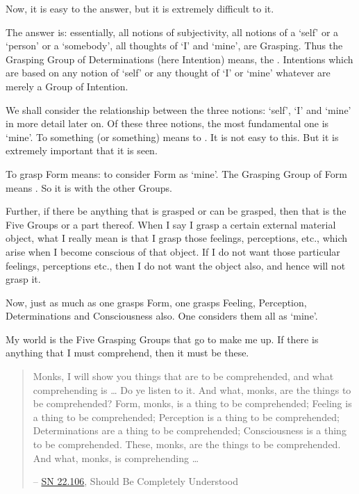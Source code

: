 Now, it is easy to  the answer, but it is extremely difficult to  it.

The answer is: essentially, all notions of subjectivity, all notions of a `self' or a `person' or a `somebody', all thoughts of `I' and `mine', are Grasping. Thus the Grasping Group of Determinations (here Intention) means, the . Intentions which are  based on any notion of `self' or any thought of `I' or `mine' whatever are merely a Group of Intention.

We shall consider the relationship between the three notions: `self', `I' and `mine' in more detail later on. Of these three notions, the most fundamental one is `mine'. To  something (or  something) means to . It is not easy to  this. But it is extremely important that it is seen.

To grasp Form means: to consider Form as `mine'. The Grasping Group of Form means . So it is with the other Groups.

Further, if there be anything that is grasped or can be grasped, then that is the Five Groups or a part thereof. When I say I grasp a certain external material object, what I really mean is that I grasp those feelings, perceptions, etc., which arise when I become conscious of that object. If I do not want those particular feelings, perceptions etc., then I do not want the object also, and hence will not grasp it.

Now, just as much as one grasps Form, one grasps Feeling, Perception, Determinations and Consciousness also. One considers them all as `mine'.

My world is the Five Grasping Groups that go to make me up. If there is anything that I must comprehend, then it must be these.

\begin{quote}
Monks, I will show you things that are to be comprehended, and what comprehending is \ldots\hspace{0pt} Do ye listen to it. And what, monks, are the things to be comprehended? Form, monks, is a thing to be comprehended; Feeling is a thing to be comprehended; Perception is a thing to be comprehended; Determinations are a thing to be comprehended; Consciousness is a thing to be comprehended. These, monks, are the things to be comprehended. And what, monks, is comprehending \ldots\hspace{0pt}

 -- \href{https://suttacentral.net/sn22.106/en/sujato}{SN 22.106}, Should Be Completely Understood
\end{quote}

